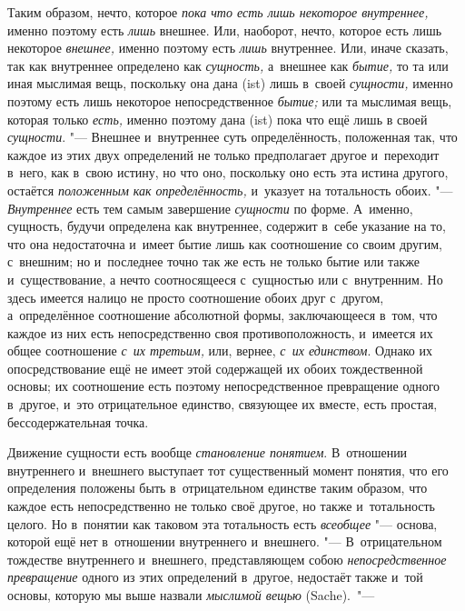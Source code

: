 Таким образом, нечто, которое {\em пока что есть лишь
некоторое внутреннее,} именно поэтому есть {\em лишь}
внешнее. Или, наоборот, нечто, которое есть лишь некоторое
{\em внешнее,} именно поэтому есть
{\em лишь} внутреннее. Или, иначе сказать, так как
внутреннее определено как {\em сущность,} а~внешнее как
{\em бытие,} то та или иная мыслимая вещь, поскольку
она дана (ist) лишь в~своей {\em сущности,} именно
поэтому есть лишь некоторое непосредственное
{\em бытие;} или та мыслимая вещь, которая только
{\em есть,} именно поэтому дана (ist) пока что ещё лишь
в своей {\em сущности}. "--- Внешнее и~внутреннее суть
определённость, положенная так, что каждое из этих двух определений не
только предполагает другое и~переходит в~него, как в~свою истину, но что
оно, поскольку оно есть эта истина другого, остаётся
{\em положенным как определённость,} и~указует на
тотальность обоих. "--- {\em Внутреннее} есть тем самым
завершение {\em сущности} по форме. А~именно, сущность,
будучи определена как внутреннее, содержит в~себе указание на то, что она
недостаточна и~имеет бытие лишь как соотношение со своим другим, с~внешним;
но и~последнее точно так же есть не только бытие или также и~существование,
а нечто соотносящееся с~сущностью или с~внутренним. Но здесь имеется налицо
не просто соотношение обоих друг с~другом, а~определённое соотношение
абсолютной формы, заключающееся в~том, что каждое из них есть
непосредственно своя противоположность, и~имеется их общее соотношение
{\em с~их третьим,} или, вернее,
{\em с~их единством}. Однако их опосредствование ещё не
имеет этой содержащей их обоих тождественной основы; их соотношение есть
поэтому непосредственное превращение одного в~другое, и~это отрицательное
единство, связующее их вместе, есть простая, бессодержательная точка.


Движение сущности есть вообще {\em становление
понятием}. В~отношении внутреннего и~внешнего выступает тот существенный
момент понятия, что его определения положены быть в~отрицательном единстве
таким образом, что каждое есть непосредственно не только своё другое, но
также и~тотальность целого. Но в~понятии как таковом эта тотальность есть
{\em всеобщее} "--- основа, которой ещё нет в~отношении
внутреннего и~внешнего. "--- В~отрицательном тождестве внутреннего и~внешнего,
представляющем собою {\em непосредственное превращение}
одного из этих определений в~другое, недостаёт также и~той основы, которую
мы выше назвали {\em мыслимой вещью} (Sache).~"---

